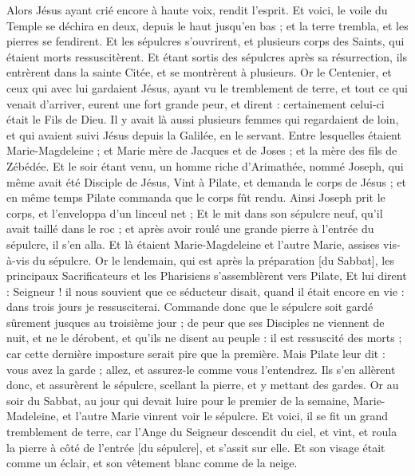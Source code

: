 \begin{multicols}{2}
Alors Jésus ayant crié encore à haute voix, rendit l'esprit.
Et voici, le voile du Temple se déchira en deux, depuis le haut jusqu'en bas ; et la terre trembla, et les pierres se fendirent.
Et les sépulcres s'ouvrirent, et plusieurs corps des Saints, qui étaient morts ressuscitèrent.
Et étant sortis des sépulcres après sa résurrection, ils entrèrent dans la sainte Citée, et se montrèrent à plusieurs.
Or le Centenier, et ceux qui avec lui gardaient Jésus, ayant vu le tremblement de terre, et tout ce qui venait d'arriver, eurent une fort grande peur, et dirent : certainement celui-ci était le Fils de Dieu.
Il y avait là aussi plusieurs femmes qui regardaient de loin, et qui avaient suivi Jésus depuis la Galilée, en le servant.
Entre lesquelles étaient Marie-Magdeleine ; et Marie mère de Jacques et de Joses ; et la mère des fils de Zébédée.
Et le soir étant venu, un homme riche d'Arimathée, nommé Joseph, qui même avait été Disciple de Jésus,
Vint à Pilate, et demanda le corps de Jésus ; et en même temps Pilate commanda que le corps fût rendu.
Ainsi Joseph prit le corps, et l'enveloppa d'un linceul net ;
Et le mit dans son sépulcre neuf, qu'il avait taillé dans le roc ; et après avoir roulé une grande pierre à l'entrée du sépulcre, il s'en alla.
Et là étaient Marie-Magdeleine et l'autre Marie, assises vis-à-vis du sépulcre.
Or le lendemain, qui est après la préparation [du Sabbat], les principaux Sacrificateurs et les Pharisiens s'assemblèrent vers Pilate,
Et lui dirent : Seigneur ! il nous souvient que ce séducteur disait, quand il était encore en vie : dans trois jours je ressusciterai.
Commande donc que le sépulcre soit gardé sûrement jusques au troisième jour ; de peur que ses Disciples ne viennent de nuit, et ne le dérobent, et qu'ils ne disent au peuple : il est ressuscité des morts ; car cette dernière imposture serait pire que la première.
Mais Pilate leur dit : vous avez la garde ; allez, et assurez-le comme vous l'entendrez.
Ils s'en allèrent donc, et assurèrent le sépulcre, scellant la pierre, et y mettant des gardes.
\VerseOne{}Or au soir du Sabbat, au jour qui devait luire pour le premier de la semaine, Marie-Madeleine, et l'autre Marie vinrent voir le sépulcre.
Et voici, il se fit un grand tremblement de terre, car l'Ange du Seigneur descendit du ciel, et vint, et roula la pierre à côté de l'entrée [du sépulcre], et s'assit sur elle.
Et son visage était comme un éclair, et son vêtement blanc comme de la neige.

\end{multicols}
